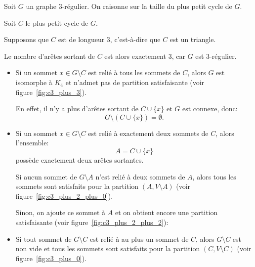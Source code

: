 Soit \(G\) un graphe \(3\)-régulier.
On raisonne sur la taille du plus petit cycle de \(G\).

Soit \(C\) le plus petit cycle de \(G\).

Supposons que \(C\) est de longueur \(3\), c'est-à-dire que \(C\) est un triangle.

Le nombre d'arêtes sortant de \(C\) est alors exactement \(3\), car \(G\) est \(3\)-régulier.

\begin{itemize}

    \item Si un sommet \(x \in G \setminus C\) est relié à tous les sommets de \(C\), alors \(G\) est isomorphe à \(K_4\) et n'admet pas de partition satisfaisante (voir figure~\ref{fig:c3_plus_3}).

    \vspace{2mm}
    

    En effet, il n'y a plus d'arêtes sortant de \(C \cup \{x\}\) et \(G\) est connexe, donc:
    \[
        G \setminus (C \cup \{x\}) = \emptyset.
    \]

    \item Si un sommet \(x \in G \setminus C\) est relié à exactement deux sommets de \(C\), alors l'ensemble:
    \[
        A = C \cup \{x\}
    \]
    possède exactement deux arêtes sortantes.

    \vspace{2mm}
    

    Si aucun sommet de \(G \setminus A\) n'est relié à deux sommets de \(A\), alors tous les sommets sont satisfaits pour la partition \((A, V \setminus A)\) (voir figure~\ref{fig:c3_plus_2_plus_0}).

    Sinon, on ajoute ce sommet à \(A\) et on obtient encore une partition satisfaisante (voir figure~\ref{fig:c3_plus_2_plus_2}):

    \vspace{2mm}

    \begin{figure}[H]
        \CenterFloatBoxes{}
        \begin{floatrow}

            

            

        \end{floatrow}
    \end{figure}

    \item Si tout sommet de \(G \setminus C\) est relié à au plus un sommet de \(C\), alors \(G \setminus C\) est non vide et tous les sommets sont satisfaits pour la partition  \((C, V \setminus C)\) (voir figure~\ref{fig:c3_plus_0}).

    \vspace{2mm}
    

\end{itemize}

